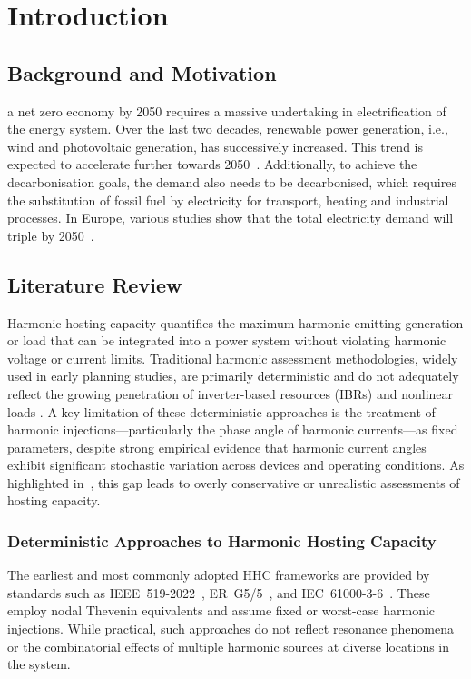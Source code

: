 \section{Introduction}
\label{sec:introduction}

\subsection{Background and Motivation}
\label{sec:background_and_motivation}

 a net zero economy by 2050 requires a massive undertaking in electrification of the energy system. Over the last two decades, renewable power generation, i.e., wind and photovoltaic generation, has successively increased. This trend is expected to accelerate further towards 2050~\cite{international_energy_agency_world_2023}. Additionally, to achieve the decarbonisation goals, the demand also needs to be decarbonised, which requires the substitution of fossil fuel by electricity for transport, heating and industrial processes. In Europe, various studies show that the total electricity demand will triple by 2050~\cite{energyville_paths_2023}. 

\subsection{Literature Review}
\label{sec:literature_review}

Harmonic hosting capacity quantifies the maximum harmonic-emitting generation or load that can be integrated into a power system without violating harmonic voltage or current limits. Traditional harmonic assessment methodologies, widely used in early planning studies, are primarily deterministic and do not adequately reflect the growing penetration of inverter-based resources (IBRs) and nonlinear loads \cite{sun2022distribution, bollen2017hosting}. A key limitation of these deterministic approaches is the treatment of harmonic injections---particularly the phase angle of harmonic currents---as fixed parameters, despite strong empirical evidence that harmonic current angles exhibit significant stochastic variation across devices and operating conditions. As highlighted in~\cite{vanacker2025impact}, this gap leads to overly conservative or unrealistic assessments of hosting capacity.

\subsubsection{Deterministic Approaches to Harmonic Hosting Capacity}
The earliest and most commonly adopted HHC frameworks are provided by standards such as IEEE~519-2022~\cite{ieee519}, ER~G5/5~\cite{erg55}, and IEC~61000-3-6~\cite{iec61000}. These employ nodal Thevenin equivalents and assume fixed or worst-case harmonic injections. While practical, such approaches do not reflect resonance phenomena or the combinatorial effects of multiple harmonic sources at diverse locations in the system.

